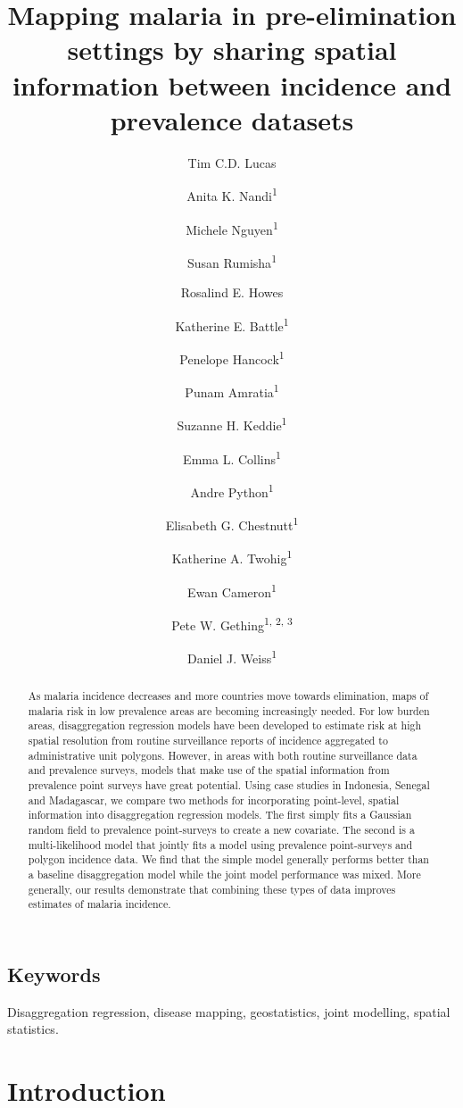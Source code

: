 \documentclass{statsoc}
\title[Mapping malaria by sharing spatial information]{Mapping malaria in pre-elimination settings by sharing spatial information between incidence and prevalence datasets}
\author[Tim C.D. Lucas {\it et al.}]{Tim C.D. Lucas}
\author{Anita K. Nandi\textsuperscript{1}}
\author{Michele Nguyen\textsuperscript{1}}
\author{Susan Rumisha\textsuperscript{1}}
\author{Rosalind E. Howes}
\author{Katherine E. Battle\textsuperscript{1}}
\author{Penelope Hancock\textsuperscript{1}}
\author{Punam Amratia\textsuperscript{1}}
\author{Suzanne H. Keddie\textsuperscript{1}}
\author{Emma L. Collins\textsuperscript{1}}
\author{Andre Python\textsuperscript{1}}
\author{Elisabeth G. Chestnutt\textsuperscript{1}}
\author{Katherine A. Twohig\textsuperscript{1}}
\author{Ewan Cameron\textsuperscript{1}}
\author{Pete W. Gething\textsuperscript{1, 2, 3}}
\author{Daniel J. Weiss\textsuperscript{1}}
\begin{document}
\begin{abstract}
As malaria incidence decreases and more countries move towards elimination, maps of malaria risk in low prevalence areas are becoming increasingly needed.
For low burden areas, disaggregation regression models have been developed to estimate risk at high spatial resolution from routine surveillance reports of incidence aggregated to administrative unit polygons.
However, in areas with both routine surveillance data and prevalence surveys, models that make use of the spatial information from prevalence point surveys have great potential.
Using case studies in Indonesia, Senegal and Madagascar, we compare two methods for incorporating point-level, spatial information into disaggregation regression models.
The first simply fits a Gaussian random field to prevalence point-surveys to create a new covariate.
The second is a multi-likelihood model that jointly fits a model using prevalence point-surveys and polygon incidence data.
We find that the simple model generally performs better than a baseline disaggregation model while the joint model performance was mixed.
More generally, our results demonstrate that combining these types of data improves estimates of malaria incidence.
\end{abstract}

\subsection{Keywords}
Disaggregation regression, disease mapping, geostatistics, joint modelling, spatial statistics.


\section*{Introduction}


\end{document}

